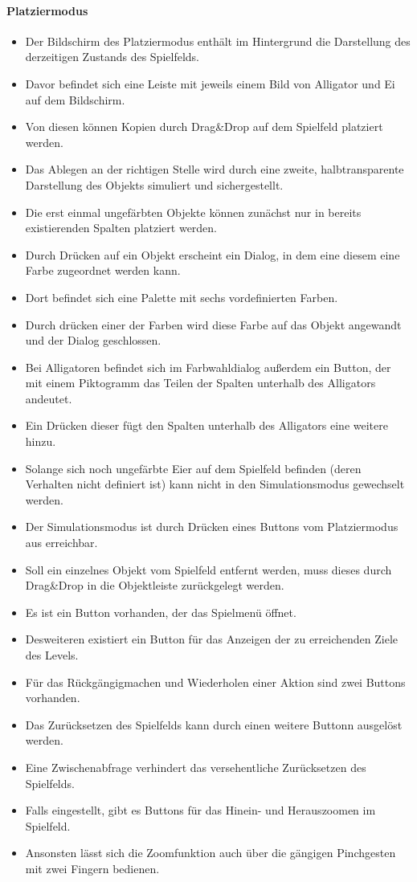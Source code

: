 \paragraph{Platziermodus}
\begin{itemize}
\item Der Bildschirm des Platziermodus enthält im Hintergrund die Darstellung
des derzeitigen Zustands des Spielfelds.
\item Davor befindet sich eine Leiste mit jeweils einem Bild von Alligator und Ei auf dem Bildschirm.
\item Von diesen können Kopien durch Drag\&Drop auf dem Spielfeld platziert werden. 
\item Das Ablegen an der richtigen Stelle wird durch eine zweite, 
halbtransparente Darstellung des Objekts simuliert und sichergestellt. 
\item Die erst einmal ungefärbten Objekte können zunächst nur in bereits 
existierenden Spalten platziert werden.
\item  Durch Drücken auf ein Objekt erscheint 
ein Dialog, in dem eine diesem eine Farbe zugeordnet werden kann.
\item Dort befindet sich eine Palette mit sechs vordefinierten Farben.
\item Durch drücken einer der Farben wird diese Farbe auf das Objekt angewandt und der Dialog geschlossen.
\item Bei Alligatoren befindet sich im Farbwahldialog außerdem ein Button, der mit einem
Piktogramm das Teilen der Spalten unterhalb des Alligators andeutet.
\item Ein Drücken dieser fügt den Spalten unterhalb des Alligators eine weitere hinzu.
\item Solange sich noch ungefärbte Eier auf dem Spielfeld befinden (deren Verhalten
nicht definiert ist) kann nicht in den Simulationsmodus gewechselt werden.
\item Der Simulationsmodus ist durch Drücken eines Buttons vom Platziermodus
aus erreichbar.
\item Soll ein einzelnes Objekt vom Spielfeld entfernt werden, muss dieses durch Drag\&Drop
in die Objektleiste zurückgelegt werden.
\item Es ist ein Button vorhanden, der das Spielmenü öffnet.
\item Desweiteren existiert ein Button für das Anzeigen der zu erreichenden Ziele des Levels.
\item Für das Rückgängigmachen und Wiederholen einer Aktion sind zwei Buttons vorhanden.
\item Das Zurücksetzen des Spielfelds kann durch einen weitere Buttonn ausgelöst werden.
\item Eine Zwischenabfrage verhindert das versehentliche Zurücksetzen des Spielfelds.
\item Falls eingestellt, gibt es Buttons für das Hinein- und Herauszoomen im Spielfeld.
\item Ansonsten lässt sich die Zoomfunktion auch über die gängigen Pinchgesten mit zwei Fingern bedienen.
\end{itemize}

